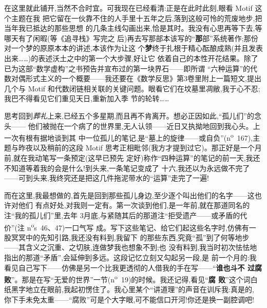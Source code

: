 在这里就此铺开,当然不合时宜。可我现在已经看清:正是在此时此刻,眼看 Motif 这个主题在我
把它留在一伙靠不住的人手里十五年之后,落到这般可怜的荒废地步,把当年我已抵达的那些思想
的几条主线勾画出来,恰是其时。我没有心思再等下去,等哪天有了闲暇(等《追寻栈》写完之
后)再去写那部本该写的“\textbf{那}部”系统著作;那份对一个梦的原原本本的讲述,本该作为让这
个\textbf{梦}终于扎根于精心酝酿成熟(并且发表出来……)的表述沃土之中的第一个\dmark{}大步骤,好让它
依着自己的本性开花结果。除了已为这部“数学虚构”之书预告并宣布过的第一块界石——即所谓
“六种运算”的代数对偶形式主义的一个概要——我还要在《数学反思》第3卷里附上一篇短文,提出
几个与 Motif 和代数闭链相关联的关键问题。眼看它们在坟墓里凋敝,我于心不忍;我巴不得看见它们重见天日,重新加入季
节的轮转……

思考回到\emph{葬礼}上来,已经五个多星期,而且再不肯离开。想必正因如此,“孤儿们”的念头——
他们被抛在一个病了的世界里,无人认领——近日又执拗地回到我心头。上一次有根有据地谈到其
中一位孤儿的笔记,是“墓上的旋律——或自负”(n\textsuperscript{o}~167),主题与昨夜以及稍前的这段
Motif 思考正相毗邻(我方才提到过它)。那正好是一个月前,就在我动笔写一条预定(这早已预先
定好)称作“四种运算”的笔记的前一天,我还不知道等着我的会是什么!到头来,一条笔记变成了
十六,我还以为永远做不完了——可到头来,我终究还是把这几件拖泥带水的“运算”走完了一遍!

而在这里,我最想做的,首先是回到那些孤儿身边,至少逐个叫出他们的名字——这也许对他们
有点好处,对我则一定有。第一次谈到他们,是一年前,就在那道同名的注“我的孤儿们”里,去年
3月底,与紧随其后的那道注“拒受遗产——或矛盾的代价”(注 n\textsuperscript{o}s~46、47)一口气写
成。写下这些笔记、给它们起这些名字时,仿佛有一股冥冥中的先知引路,我还没有料到,我留下
的那些东西,究竟“孤”到了何等地步\dmark{}——其含义之沉重、之切肤,连做梦我也想象不到;也
没有料到,我当时初次怯怯地指出的那道“矛盾”,会延伸到多远。这段记忆立刻又勾起另一段,是
前一个月的:我看见自己写下——仿佛是另一个比我更透彻的人借我的手在写——“\textbf{谁也斗不
过腐败}”。那是在写“无爱的世界”一节(n\textsuperscript{o}~19)的时候。我还记得,看见“\textbf{腐
败}”这个词白纸黑字地立在眼前,我起初愣住了。我心里某个“讲道理”的声音在训斥我:真是的,
你下手未免太重——“腐败”可是个大字眼,可不能信口开河!你还是换一副腔调吧!

